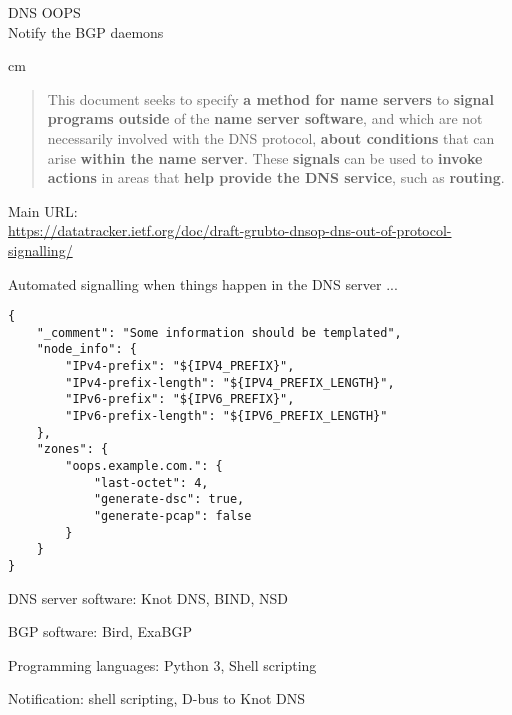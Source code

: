 \documentclass[Screen16to9,17pt]{foils}
\begin{document}
{}

\mytitlepage
{DNS OOPS\\\small Notify the BGP daemons}

\LogoOn

 cm


\begin{quote}

   This document seeks to specify {\bf a method for name servers} to {\bf signal
   programs outside} of the {\bf name server software}, and which are not
   necessarily involved with the DNS protocol, {\bf about conditions} that can
   arise {\bf within the name server}.  These {\bf signals} can be used to {\bf invoke
   actions} in areas that {\bf help provide the DNS service}, such as {\bf routing}.

\end{quote}

Main URL:\\
\url{https://datatracker.ietf.org/doc/draft-grubto-dnsop-dns-out-of-protocol-signalling/}
\begin{list1}
\item
\end{list1}



Automated signalling when things happen in the DNS server ...


\begin{verbatim}
{
    "_comment": "Some information should be templated",
    "node_info": {
        "IPv4-prefix": "${IPV4_PREFIX}",
        "IPv4-prefix-length": "${IPV4_PREFIX_LENGTH}",
        "IPv6-prefix": "${IPV6_PREFIX}",
        "IPv6-prefix-length": "${IPV6_PREFIX_LENGTH}"
    },
    "zones": {
        "oops.example.com.": {
            "last-octet": 4,
            "generate-dsc": true,
            "generate-pcap": false
        }
    }
}
\end{verbatim}




\begin{list2}
\item DNS server software: Knot DNS, BIND, NSD
\item BGP software: Bird, ExaBGP
\item Programming languages: Python 3, Shell scripting
\item Notification: shell scripting, D-bus to Knot DNS
\end{list2}
\end{document}
